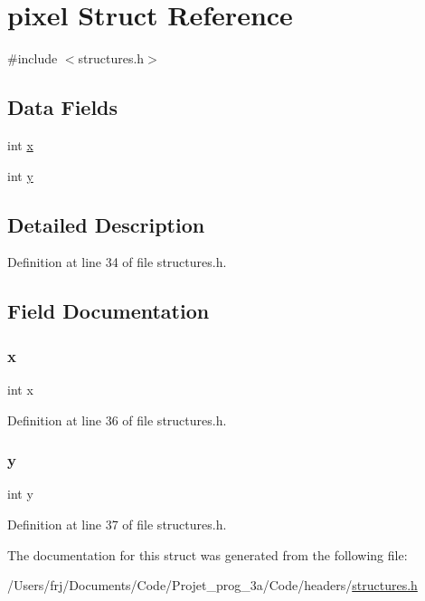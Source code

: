 \hypertarget{structpixel}{}\section{pixel Struct Reference}
\label{structpixel}


{\ttfamily \#include $<$structures.\+h$>$}

\subsection*{Data Fields}
\begin{DoxyCompactItemize}
\item 
int \hyperlink{structpixel_a6150e0515f7202e2fb518f7206ed97dc}{x}
\item 
int \hyperlink{structpixel_a0a2f84ed7838f07779ae24c5a9086d33}{y}
\end{DoxyCompactItemize}


\subsection{Detailed Description}


Definition at line 34 of file structures.\+h.



\subsection{Field Documentation}
\hypertarget{structpixel_a6150e0515f7202e2fb518f7206ed97dc}{}\label{structpixel_a6150e0515f7202e2fb518f7206ed97dc} 
\subsubsection{\texorpdfstring{x}{x}}
{\footnotesize\ttfamily int x}



Definition at line 36 of file structures.\+h.

\hypertarget{structpixel_a0a2f84ed7838f07779ae24c5a9086d33}{}\label{structpixel_a0a2f84ed7838f07779ae24c5a9086d33} 
\subsubsection{\texorpdfstring{y}{y}}
{\footnotesize\ttfamily int y}



Definition at line 37 of file structures.\+h.



The documentation for this struct was generated from the following file\+:\begin{DoxyCompactItemize}
\item 
/\+Users/frj/\+Documents/\+Code/\+Projet\+\_\+prog\+\_\+3a/\+Code/headers/\hyperlink{structures_8h}{structures.\+h}\end{DoxyCompactItemize}
